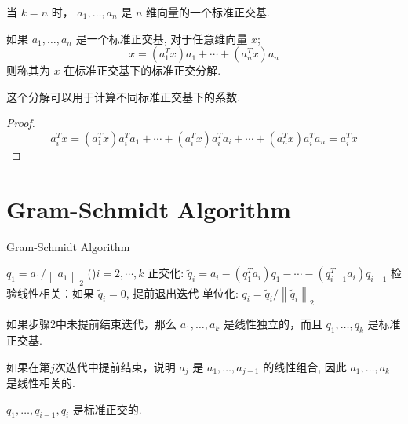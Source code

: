\begin{definition}[$n$维向量的一个标准正交基]
    当 $ k=n $ 时， $ a_{1}, \ldots, a_{n} $ 是 $ n $ 维向量的一个标准正交基. 
\end{definition}

\begin{definition}[ $ x $ 在标准正交基下的标准正交分解]
    如果 $ a_{1}, \ldots, a_{n} $ 是一个标准正交基, 对于任意维向量 $ x $;
$$
x=\left(a_{1}^{T} x\right) a_{1}+\cdots+\left(a_{n}^{T} x\right) a_{n}
$$
则称其为 $ x $ 在标准正交基下的标准正交分解. 
\end{definition}

    这个分解可以用于计算不同标准正交基下的系数. 

\begin{proof}
    $$ a_{i}^{T} x=\left(a_{1}^{T} x\right) a_{i}^{T} a_{1}+\cdots+\left(a_{i}^{T} x\right) a_{i}^{T} a_{i}+\cdots+\left(a_{n}^{T} x\right) a_{i}^{T} a_{n}=a_{i}^{T} x $$
\end{proof}

\section{Gram-Schmidt Algorithm}

\begin{algorithm}[htbp]
    \caption{Gram-Schmidt Algorithm}
    $ q_{1}=a_{1} /\left\|a_{1}\right\|_{2} $\;
    \While(){$i=2,\cdots,k$}{
        正交化: $ \widetilde{q}_{i}=a_{i}-\left(q_{1}^{T} a_{i}\right) q_{1}-\cdots-\left(q_{i-1}^{T} a_{i}\right) q_{i-1} $\;
        检验线性相关：如果 $ \widetilde{q}_{i}=0 $, 提前退出迭代\;
        单位化: $ q_{i}=\widetilde{q}_{i} /\left\|\widetilde{q}_{i}\right\|_{2} $\;
    }
\end{algorithm}

如果步骤2中未提前结束迭代，那么 $ a_{1}, \ldots, a_{k} $ 是线性独立的，而且 $ q_{1}, \ldots, q_{k} $ 是标准正交基. 

如果在第$j$次迭代中提前结束，说明 $ a_{j} $ 是 $ a_{1}, \ldots, a_{j-1} $ 的线性组合, 因此 $ a_{1}, \ldots, a_{k} $ 是线性相关的. 

\begin{theorem}
    $q_{1}, \ldots, q_{i-1}, q_{i} $ 是标准正交的. 
\end{theorem}

